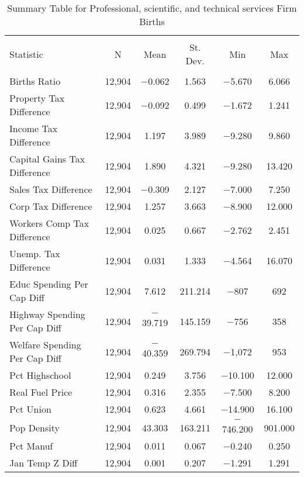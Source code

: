 
\begin{table}[!htbp] \centering 
  \caption{Summary Table for  Professional, scientific, and technical services Firm Births} 
  \label{54summary} 
\begin{tabular}{@{\extracolsep{5pt}}lccccc} 
\\[-1.8ex]\hline 
\hline \\[-1.8ex] 
Statistic & \multicolumn{1}{c}{N} & \multicolumn{1}{c}{Mean} & \multicolumn{1}{c}{St. Dev.} & \multicolumn{1}{c}{Min} & \multicolumn{1}{c}{Max} \\ 
\hline \\[-1.8ex] 
Births Ratio & 12,904 & $-$0.062 & 1.563 & $-$5.670 & 6.066 \\ 
Property Tax Difference & 12,904 & $-$0.092 & 0.499 & $-$1.672 & 1.241 \\ 
Income Tax Difference & 12,904 & 1.197 & 3.989 & $-$9.280 & 9.860 \\ 
Capital Gains Tax Difference & 12,904 & 1.890 & 4.321 & $-$9.280 & 13.420 \\ 
Sales Tax Difference & 12,904 & $-$0.309 & 2.127 & $-$7.000 & 7.250 \\ 
Corp Tax Difference & 12,904 & 1.257 & 3.663 & $-$8.900 & 12.000 \\ 
Workers Comp Tax Difference & 12,904 & 0.025 & 0.667 & $-$2.762 & 2.451 \\ 
Unemp. Tax Difference & 12,904 & 0.031 & 1.333 & $-$4.564 & 16.070 \\ 
Educ Spending Per Cap Diff & 12,904 & 7.612 & 211.214 & $-$807 & 692 \\ 
Highway Spending Per Cap Diff & 12,904 & $-$39.719 & 145.159 & $-$756 & 358 \\ 
Welfare Spending Per Cap Diff & 12,904 & $-$40.359 & 269.794 & $-$1,072 & 953 \\ 
Pct Highschool & 12,904 & 0.249 & 3.756 & $-$10.100 & 12.000 \\ 
Real Fuel Price & 12,904 & 0.316 & 2.355 & $-$7.500 & 8.200 \\ 
Pct Union & 12,904 & 0.623 & 4.661 & $-$14.900 & 16.100 \\ 
Pop Density & 12,904 & 43.303 & 163.211 & $-$746.200 & 901.000 \\ 
Pct Manuf & 12,904 & 0.011 & 0.067 & $-$0.240 & 0.250 \\ 
Jan Temp Z Diff & 12,904 & 0.001 & 0.207 & $-$1.291 & 1.291 \\ 

\end{tabular}
\end{table}

